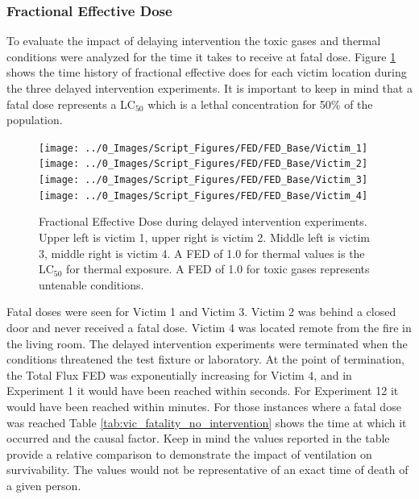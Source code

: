 \documentclass[12pt,oneside]{book}
\begin{document}
\subsubsection{Fractional Effective Dose}
To evaluate the impact of delaying intervention the toxic gases and thermal conditions were analyzed for the time it takes to receive at fatal dose. Figure \ref{fig:FED_Base_no_int} shows the time history of fractional effective does for each victim location during the three delayed intervention experiments. It is important to keep in mind that a fatal dose represents a LC$_{50}$ which is a lethal concentration for 50\% of the population. 

\begin{figure}[H]
	\centering
	\texttt{[image: ../0\_Images/Script\_Figures/FED/FED\_Base/Victim\_1]}
	\texttt{[image: ../0\_Images/Script\_Figures/FED/FED\_Base/Victim\_2]}
	\texttt{[image: ../0\_Images/Script\_Figures/FED/FED\_Base/Victim\_3]}
	\texttt{[image: ../0\_Images/Script\_Figures/FED/FED\_Base/Victim\_4]}
	\caption[Fractional Effective Dose - Delayed Intervention]{Fractional Effective Dose during delayed intervention experiments. Upper left is victim 1, upper right is victim 2. Middle left is victim 3, middle right is victim 4. A FED of 1.0 for thermal values is the LC$_{50}$ for thermal exposure. A FED of 1.0 for toxic gases represents untenable conditions.}
	\label{fig:FED_Base_no_int}
\end{figure}

Fatal doses were seen for Victim 1 and Victim 3. Victim 2 was behind a closed door and never received a fatal dose. Victim 4 was located remote from the fire in the living room. The delayed intervention experiments were terminated when the conditions threatened the test fixture or laboratory. At the point of termination, the Total Flux FED was exponentially increasing for Victim 4, and in Experiment 1 it would have been reached within seconds. For Experiment 12 it would have been reached within minutes. For those instances where a fatal dose was reached Table \ref{tab:vic_fatality_no_intervention} shows the time at which it occurred and the causal factor.  Keep in mind the values reported in the table provide a relative comparison to demonstrate the impact of ventilation on survivability.  The values would not be representative of an exact time of death of a given person. 
\end{document}
